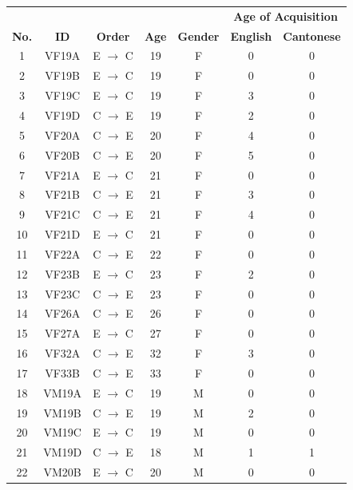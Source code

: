 \begin{table}[!htbp]
  \begin{center}
    \footnotesize
      \begin{tabular}{ccccccc}
  \toprule
    & & & &                & \multicolumn{2}{c}{\textbf{Age of Acquisition}} \\
  \textbf{No.} & \textbf{ID} & \textbf{Order} & \textbf{Age} & \textbf{Gender} & \textbf{English} & \textbf{Cantonese} \\
  \midrule
  1 & VF19A & E $\rightarrow$ C & 19  & F & 0   & 0 \\
  2 & VF19B & E $\rightarrow$ C & 19  & F & 0   & 0 \\
  3 & VF19C & E $\rightarrow$ C & 19  & F & 3   & 0 \\
  4 & VF19D & C $\rightarrow$ E & 19  & F & 2   & 0 \\
  5 & VF20A & C $\rightarrow$ E & 20  & F & 4   & 0 \\
  6 & VF20B & C $\rightarrow$ E & 20  & F & 5   & 0 \\
  7 & VF21A & E $\rightarrow$ C & 21  & F & 0   & 0 \\
  8 & VF21B & C $\rightarrow$ E & 21  & F & 3   & 0 \\
  9 & VF21C & C $\rightarrow$ E & 21  & F & 4   & 0 \\
  10  & VF21D & E $\rightarrow$ C & 21  & F & 0   & 0 \\
  11  & VF22A & C $\rightarrow$ E & 22  & F & 0   & 0 \\
  12  & VF23B & E $\rightarrow$ C & 23  & F & 2   & 0 \\
  13  & VF23C & C $\rightarrow$ E & 23  & F & 0   & 0 \\
  14  & VF26A & C $\rightarrow$ E & 26  & F & 0   & 0 \\
  15  & VF27A & E $\rightarrow$ C & 27  & F & 0   & 0 \\
  16  & VF32A & C $\rightarrow$ E & 32  & F & 3   & 0 \\
  17  & VF33B & C $\rightarrow$ E & 33  & F & 0   & 0 \\
  18  & VM19A & E $\rightarrow$ C & 19  & M & 0   & 0 \\
  19  & VM19B & C $\rightarrow$ E & 19  & M & 2   & 0 \\
  20  & VM19C & E $\rightarrow$ C & 19  & M & 0   & 0 \\
  21  & VM19D & C $\rightarrow$ E & 18  & M & 1   & 1 \\
  22  & VM20B & E $\rightarrow$ C & 20  & M & 0   & 0 \\

\end{tabular}
\end{center}
\end{table}
